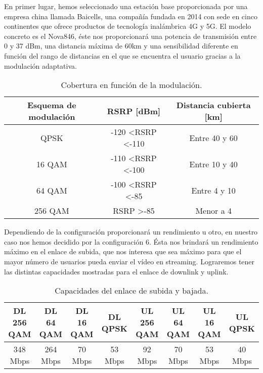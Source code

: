 En primer lugar, hemos seleccionado una estación base proporcionada por una empresa china llamada Baicells, una compañía fundada en 2014 con sede en cinco continentes que ofrece productos de tecnología inalámbrica 4G y 5G. El modelo concreto es el Nova846, éste nos proporcionará una potencia de transmisión entre 0 y 37 dBm, una distancia máxima de 60km y una sensibilidad diferente en función del rango de distancias en el que se encuentra el usuario gracias a la modulación adaptativa.\\

\begin{table}[H]
\centering
\begin{tabular}{|c|c|c|}
\hline
\textbf{Esquema de modulación} & \textbf{RSRP {[}dBm{]}}            & \textbf{Distancia cubierta {[}km{]}} \\ \hline
QPSK                           & -120 \textless RSRP \textless -110 & Entre 40 y 60                        \\ \hline
16 QAM                         & -110 \textless RSRP \textless -100 & Entre 10 y 40                        \\ \hline
64 QAM                         & -100 \textless RSRP \textless -85  & Entre 4 y 10                         \\ \hline
256 QAM                        & RSRP \textgreater -85              & Menor a 4                            \\ \hline
\end{tabular}
\caption{Cobertura en función de la modulación.}
\label{cobertura}
\end{table}

Dependiendo de la configuración proporcionará un rendimiento u otro, en nuestro caso nos hemos decidido por la configuración 6. Ésta nos brindará un rendimiento máximo en el enlace de subida, que nos interesa que sea máximo para que el mayor número de usuarios pueda enviar el vídeo en streaming. Lograremos tener las distintas capacidades mostradas para el enlace de downlink y uplink.\\

\begin{table}[H]
\centering
\begin{tabular}{|c|c|c|c|c|c|c|c|} 
\hline
DL 256 QAM & DL 64 QAM & DL 16 QAM & DL QPSK & UL 256 QAM & UL 64 QAM & UL 16 QAM & UL QPSK \\ \hline
348 Mbps   & 264 Mbps  & 70 Mbps   & 53 Mbps & 92 Mbps    & 70 Mbps   & 53 Mbps   & 40 Mbps \\ \hline
\end{tabular}
\caption{Capacidades del enlace de subida y bajada.}
\label{capacidad}
\end{table}
